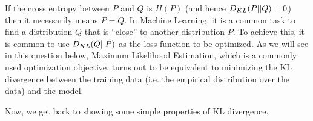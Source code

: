 If the cross entropy between $P$ and $Q$ is $H(P)$ (and hence $D_{KL}(P||Q) = 0$) then it necessarily
means $P = Q$. In Machine Learning, it is a common task to find a distribution $Q$ that is ``close'' to
another distribution $P$. To achieve this, it is common to use $D_{KL}(Q||P)$ as the loss function to be optimized.
As we will see in this question below, Maximum Likelihood Estimation, which is a commonly used
optimization objective, turns out to be equivalent to minimizing the KL divergence between the training data
(i.e. the empirical distribution over the data)
and the model.

Now, we get back to showing some simple properties of KL divergence.

\begin{enumerate}

  
\ifnum{} {
  
} \fi

  
\ifnum{} {
  
} \fi

  

\ifnum{} {
  
} \fi

\end{enumerate}
